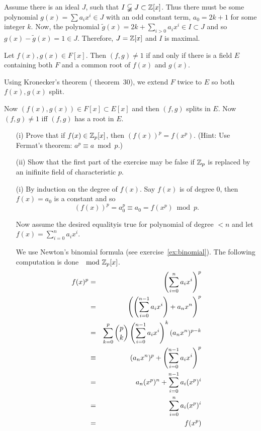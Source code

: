 \begin{myenumerate}
Assume there is an ideal $J$, such that
\(I \varsubsetneqq J \subset \mathbb{Z}[x]\).
Thus there  must be some polynomial \(g(x)=\sum a_ix^i \in J\)
with an odd constant term, \(a_0=2k+1\) for some integer $k$.
Now, the polynomial \(\tilde{g}(x)=2k+\sum_{i>0}  a_ix^i \in I\subset J\)
and so \(g(x)-\tilde{g}(x)=1\in J\).
Therefore, \(J=\mathbb{Z}[x]\) and $I$ is maximal.

\item
\begin{excopy}
Let \(f(x),g(x)\in F[x]\). Then \((f,g)\neq 1\) if and only if there is a field
$E$ containing both $F$ and a common root of \(f(x)\) and \(g(x)\).
\end{excopy}

Using Kronecker's theorem (\cite{Rotman98} theorem~30),
we extend $F$ twice to $E$ so both \(f(x),g(x)\) split.

Now  \((f(x),g(x))\in F[x]\subset E[x]\) and then \((f,g)\)
splits in $E$.
Now \((f,g)\neq 1\) iff \((f,g)\) has a root in $E$.


\item
\begin{excopy}
\begin{itemize}
 \item[(i)]
   Prove that if \(f(x)\in \mathbb{Z}_p[x]\), then \((f(x))^p=f(x^p)\).
   (Hint: Use Fermat's theorem: \(a^p\equiv a \bmod p\).)
 \item[(ii)]
   Show that the first part of the exercise may be false if
   \(\mathbb{Z}_p\) is replaced by an inifinite field of characteristic $p$.
\end{itemize}
\end{excopy}

\begin{itemize}
 \item[(i)]
   By induction on the degree of \(f(x)\).
   Say \(f(x)\) is of degree 0, then \(f(x)=a_0\) is a constant
   and so \[(f(x))^p = a_0^p \equiv a_0 = f(x^p) \bmod p.\]

   Now assume the desired equalityis true for polynomial
   of degree \(<n\) and let \(f(x)=\sum_{i=0}^n a_ix^i\).

   We use Newton's binomial formula (see exercise~\ref{ex:binomial}).
   The following computation is done \(\mod {\mathbb{Z}}_p[x]\).
   \begin{eqnarray}
   f(x)^p
    & = & \left(\sum_{i=0}^n a_ix^i\right)^p \notag \\
    & = & \left(\left(\sum_{i=0}^{n-1} a_ix^i\right) + a_nx^n\right)^p \notag \\
    & = & \sum_{k=0}^p \binom{p}{k}
                       \left(\sum_{i=0}^{n-1} a_ix^i\right)^k
                       (a_nx^n)^{p-k} \notag \\
    & \equiv & \label{eq:binom:modp}
           (a_nx^n)^p +  \left(\sum_{i=0}^{n-1} a_ix^i\right)^p \\
    & = &      \label{eq:binom:induc}
           a_n (x^p)^n + \sum_{i=0}^{n-1} a_i(x^p)^i \\
    & = & \sum_{i=0}^n a_i(x^p)^i \notag \\
    & = & f(x^p) \notag
   \end{eqnarray}


\end{itemize}
\end{myenumerate}
